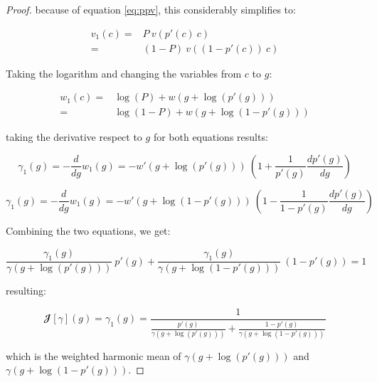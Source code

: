 \documentclass{article}
\theoremstyle{definition}
\begin{document}
\begin{proof}
    because of equation \eqref{eq:ppv}, this considerably simplifies to:

    \begin{equation}
        \begin{split}
            v_1(c) = & P \ v(p'(c) \ c) \\ 
                    = & (1-P) \ v((1-p'(c)) \ c)
        \end{split}
    \end{equation}

    Taking the logarithm and changing the variables from $c$ to $g$:

    \begin{equation}
        \begin{split}
            w_1(c) = & \log(P) + w(g + \log(p'(g)) ) \\ 
                    = & \log(1-P) + w(g + \log(1-p'(g)) )
        \end{split}
    \end{equation}

    taking the derivative respect to $g$ for both equations results:

    \begin{equation}
        \gamma_1(g) = - \frac{d}{d g} w_1(g) = - w'(g + \log(p'(g)) ) \ \left ( 1 + \frac{1}{p'(g)}\frac{d p'(g)}{d g} \right )
    \end{equation}

    \begin{equation}
        \gamma_1(g) = - \frac{d}{d g} w_1(g) = - w'(g + \log(1-p'(g)) ) \ \left ( 1 - \frac{1}{1-p'(g)}\frac{d p'(g)}{d g} \right )
    \end{equation}

    Combining the two equations, we get:

    \begin{equation}
        \frac{\gamma_1(g)}{\gamma(g + \log(p'(g)))} \ p'(g) +
        \frac{\gamma_1(g)}{\gamma(g + \log(1-p'(g)))} \ (1-p'(g)) = 1  
    \end{equation}
    
    resulting:

    \begin{equation}
        \mathbfcal{J}[\gamma](g) = \gamma_1(g) = \frac{1}{\frac{p'(g)}{\gamma(g+ \log(p'(g)))} + \frac{1-p'(g)}{\gamma(g+ \log(1-p'(g)))}}
    \end{equation}

    which is the weighted harmonic mean of $\gamma(g+ \log(p'(g)))$ and $\gamma(g+ \log(1-p'(g)))$.


\end{proof}
\end{document}
